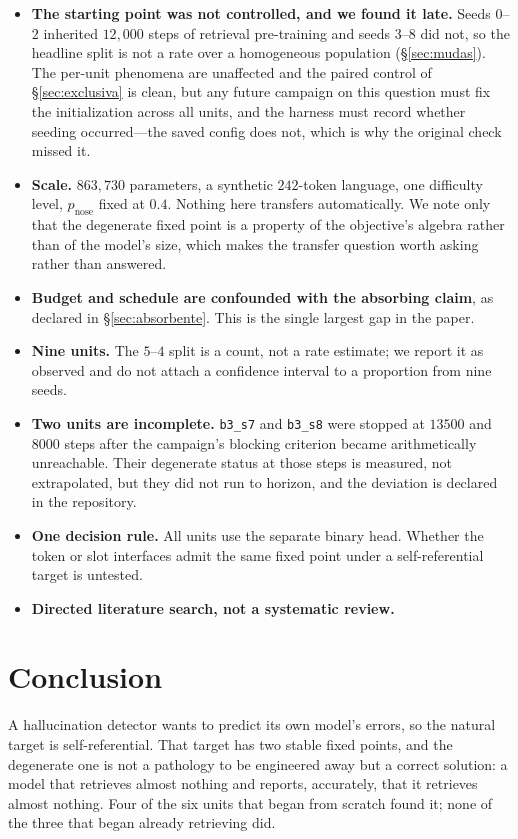 \documentclass[11pt,a4paper]{article}
\begin{document}
\begin{itemize}
\item \textbf{The starting point was not controlled, and we found it late.} Seeds $0$--$2$ inherited
$12{,}000$ steps of retrieval pre-training and seeds $3$--$8$ did not, so the headline split is not a
rate over a homogeneous population (\S\ref{sec:mudas}). The per-unit phenomena are unaffected and the
paired control of \S\ref{sec:exclusiva} is clean, but any future campaign on this question must fix
the initialization across all units, and the harness must record whether seeding occurred---the saved
config does not, which is why the original check missed it.
\item \textbf{Scale.} $863{,}730$ parameters, a synthetic $242$-token language, one difficulty level,
$p_{\mathrm{nose}}$ fixed at $0.4$. Nothing here transfers automatically. We note only that the
degenerate fixed point is a property of the objective's algebra rather than of the model's size,
which makes the transfer question worth asking rather than answered.
\item \textbf{Budget and schedule are confounded with the absorbing claim}, as declared in
\S\ref{sec:absorbente}. This is the single largest gap in the paper.
\item \textbf{Nine units.} The $5$--$4$ split is a count, not a rate estimate; we report it as
observed and do not attach a confidence interval to a proportion from nine seeds.
\item \textbf{Two units are incomplete.} \texttt{b3\_s7} and \texttt{b3\_s8} were stopped at $13500$
and $8000$ steps after the campaign's blocking criterion became arithmetically unreachable. Their
degenerate status at those steps is measured, not extrapolated, but they did not run to horizon, and
the deviation is declared in the repository.
\item \textbf{One decision rule.} All units use the separate binary head. Whether the token or slot
interfaces admit the same fixed point under a self-referential target is untested.
\item \textbf{Directed literature search, not a systematic review.}
\end{itemize}

\section{Conclusion}

A hallucination detector wants to predict its own model's errors, so the natural target is
self-referential. That target has two stable fixed points, and the degenerate one is not a
pathology to be engineered away but a correct solution: a model that retrieves almost nothing and
reports, accurately, that it retrieves almost nothing. Four of the six units that began from scratch
found it; none of the three that began already retrieving did.
\end{document}

